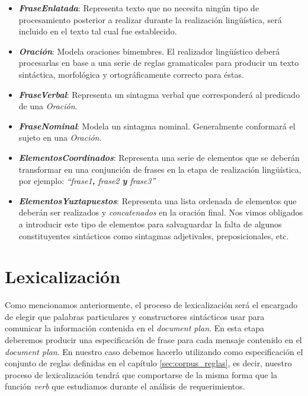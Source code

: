 \medskip
\begin{itemize}
\item{\emph{\textbf{FraseEnlatada}}: Representa texto que no necesita ningún tipo de procesamiento posterior a realizar durante la realización lingüística, será incluido en el texto tal cual fue establecido.}
\item{\emph{\textbf{Oración}}: Modela oraciones bimembres. El realizador lingüístico deberá procesarlas en base a una serie de reglas gramaticales para producir un texto sintáctica, morfológica y ortográficamente correcto para éstas.}
\item{\emph{\textbf{FraseVerbal}}: Representa un sintagma verbal que corresponderá al predicado de una \emph{Oración}.}
\item{\emph{\textbf{FraseNominal}}: Modela un sintagma nominal. Generalmente conformará el sujeto en una \emph{Oración}.}
\item{\emph{\textbf{ElementosCoordinados}}: Representa una serie de elementos que se deberán transformar en una conjunción de frases en la etapa de realización lingüística, por ejemplo: \emph{``frase1\textbf{,} frase2 \textbf{y} frase3''}}
\item{\emph{\textbf{ElementosYuxtapuestos}}: Representa una lista ordenada de elementos que deberán ser realizados y \emph{concatenados} en la oración final. Nos vimos obligados a introducir este tipo de elementos para salvaguardar la falta de algunos constituyentes sintácticos como sintagmas adjetivales, preposicionales, etc.}
\end{itemize}



\section{Lexicalización}
\label{sec:microplanning_lexicalization}

Como mencionamos anteriormente, el proceso de lexicalización será el encargado de elegir que palabras particulares y constructores sintácticos usar para comunicar la información contenida en el \textit{document plan}. En esta etapa deberemos producir una especificación de frase para cada mensaje contenido en el \textit{document plan}. En nuestro caso debemos hacerlo utilizando como especificación el conjunto de reglas definidas en el capítulo \ref{sec:corpus_reglas}, es decir, nuestro proceso de lexicalización tendrá que comportarse de la misma forma que la función \emph{verb} que estudiamos durante el análisis de requerimientos.

